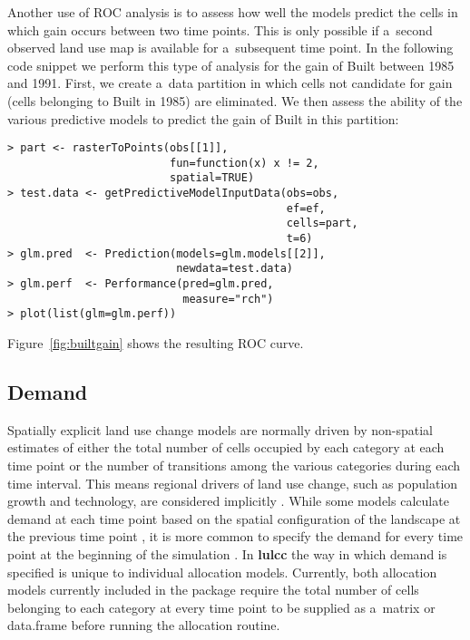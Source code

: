 \documentclass[gmdd, online, hvmath]{copernicus}
\begin{document}
Another use of ROC analysis is to assess how well the models predict the cells in which gain occurs between two time points. This is only possible if a~second observed land use map is available for a~subsequent time point. In the following code snippet we perform this type of analysis for the gain of Built between 1985 and 1991. First, we create a~data partition in which cells not candidate for gain (cells belonging to Built in 1985) are eliminated. We then assess the ability of the various predictive models to predict the gain of Built in this partition:
\begin{verbatim}
> part <- rasterToPoints(obs[[1]], 
                         fun=function(x) x != 2, 
                         spatial=TRUE) 
> test.data <- getPredictiveModelInputData(obs=obs, 
                                           ef=ef, 
                                           cells=part, 
                                           t=6) 
> glm.pred  <- Prediction(models=glm.models[[2]], 
                          newdata=test.data) 
> glm.perf  <- Performance(pred=glm.pred, 
                           measure="rch") 
> plot(list(glm=glm.perf))
\end{verbatim}\hack{\noindent}Figure~\ref{fig:builtgain} shows the resulting ROC curve. \\

\subsection{Demand}

Spatially explicit land use change models are normally driven by non-spatial estimates of either the total number of cells occupied by each category at each time point or the number of transitions among the various categories during each time interval. This means regional drivers of land use change, such as population growth and technology, are considered implicitly \citep{fuchs2013}. While some models calculate demand at each time point based on the spatial configuration of the landscape at the previous time point \citep[e.g.][]{rosa2013}, it is more common to specify the demand for every time point at the beginning of the simulation \citep[e.g.][]{pontius2001,verburg2002,sohl2007}. In \textbf{lulcc} the way in which demand is specified is unique to individual allocation models. Currently, both allocation models currently included in the package require the total number of cells belonging to each category at every time point to be supplied as a~matrix or data.frame before running the allocation routine. \\
\end{document}
